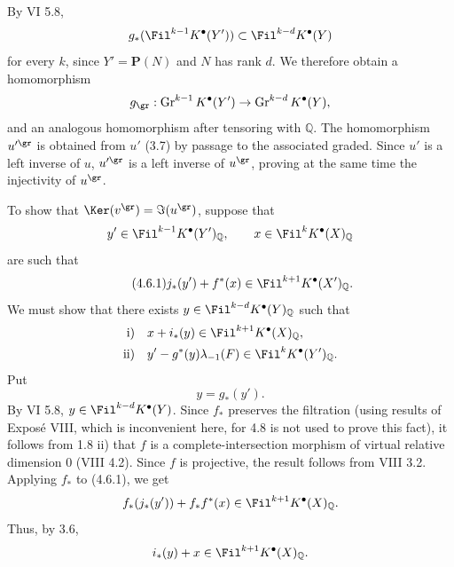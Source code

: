 By VI 5.8,
\[
  g_*(\Fil^{k-1}K^\bullet(Y'))\subset \Fil^{k-d}K^\bullet(Y)
\]
for every \(k\), since \(Y'=\mathbf P(N)\) and \(N\) has rank \(d\). We therefore obtain a homomorphism
\[
  g_{\gr}:\operatorname{Gr}^{k-1}K^\bullet(Y')
  \to\operatorname{Gr}^{k-d}K^\bullet(Y),
\]
and an analogous homomorphism after tensoring with \(\mathbb Q\). The homomorphism \(u'^{\gr}\) is obtained from \(u'\) (3.7) by passage to the associated graded. Since \(u'\) is a left inverse of \(u\), \(u'^{\gr}\) is a left inverse of \(u^{\gr}\), proving at the same time the injectivity of \(u^{\gr}\).

To show that \(\Ker(v^{\gr})=\Im(u^{\gr})\), suppose that
\[
y'\in\Fil^{k-1}K^\bullet(Y')_{\mathbb Q},\qquad
x\in\Fil^kK^\bullet(X)_{\mathbb Q}
\]
are such that
\begin{equation}\tag{4.6.1}
  j_*(y')+f^*(x)\in\Fil^{k+1}K^\bullet(X')_{\mathbb Q}.
\end{equation}
We must show that there exists \(y\in\Fil^{k-d}K^\bullet(Y)_{\mathbb Q}\) such that
\[
\begin{aligned}
\text{i)}\quad &x+i_*(y)\in\Fil^{k+1}K^\bullet(X)_{\mathbb Q},\\
\text{ii)}\quad &y'-g^*(y)\lambda_{-1}(F)\in\Fil^{k}K^\bullet(Y')_{\mathbb Q}.
\end{aligned}
\]
Put
\[
  y=g_*(y').
\]
By VI 5.8, \(y\in\Fil^{k-d}K^\bullet(Y)\). Since \(f_*\) preserves the filtration (using results of Exposé VIII, which is inconvenient here, for 4.8 is not used to prove this fact), it follows from 1.8 ii) that \(f\) is a complete-intersection morphism of virtual relative dimension \(0\) (VIII 4.2). Since \(f\) is projective, the result follows from VIII 3.2. Applying \(f_*\) to (4.6.1), we get
\[
  f_*(j_*(y'))+f_*f^*(x)\in\Fil^{k+1}K^\bullet(X)_{\mathbb Q}.
\]
Thus, by 3.6,
\[
  i_*(y)+x\in\Fil^{k+1}K^\bullet(X)_{\mathbb Q}.
\]

